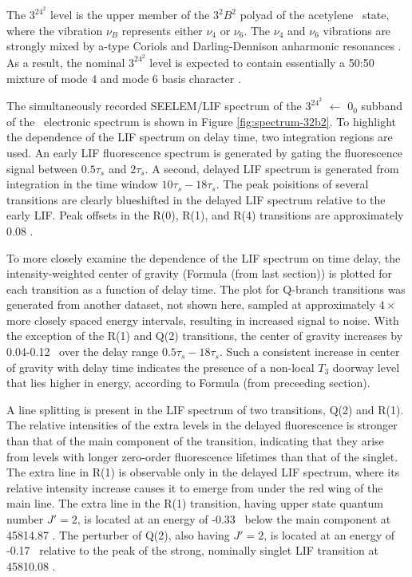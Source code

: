 \documentclass[12pt]{mitthesis}
\begin{document}
The $3^24^2$ level is the upper member of the $3^2B^2$ polyad of the
acetylene \astate\ state, where the vibration $\nu_B$ represents
either $\nu_4$ or $\nu_6$.  The $\nu_4$ and $\nu_6$ vibrations are
strongly mixed by a-type Coriols and Darling-Dennison anharmonic
resonances \cite{merer08}.  As a result, the nominal $3^24^2$ level is
expected to contain essentially a 50:50 mixture of mode 4 and mode 6
basis character \cite{merer08, virgo07}.

The simultaneously recorded SEELEM/LIF spectrum of the $3^24^2$ 
$\leftarrow$ $0_0$ subband of the \AtoX\ electronic spectrum is shown
in Figure \ref{fig:spectrum-32b2}. To highlight the dependence of the
LIF spectrum on delay time, two integration regions are used.  An
early LIF fluorescence spectrum is generated by gating the
fluorescence signal between $0.5\tau_s$ and $2\tau_s$.  A second,
delayed LIF spectrum is generated from integration in the time window
$10\tau_s-18\tau_s$.  The peak poisitions of several transitions are
clearly blueshifted in the delayed LIF spectrum relative to the early
LIF.  Peak offsets in the R(0), R(1), and R(4) transitions are
approximately 0.08 \rcm.

To more closely examine the dependence of the LIF spectrum on time
delay, the intensity-weighted center of gravity (Formula (from last
section)) is plotted for each transition as a function of delay time.
The plot for Q-branch transitions was generated from another dataset,
not shown here, sampled at approximately $4 \times$ more closely
spaced energy intervals, resulting in increased signal to noise.  With
the exception of the R(1) and Q(2) transitions, the center of gravity
increases by 0.04-0.12 \rcm\ over the delay range
$0.5\tau_s-18\tau_s$.  Such a consistent increase in center of gravity
with delay time indicates the presence of a non-local $T_3$ doorway
level that lies higher in energy, according to Formula (from
preceeding section).


A line splitting is present in the LIF spectrum of two transitions,
Q(2) and R(1).  The relative intensities of the extra levels in the
delayed fluorescence is stronger than that of the main component of
the transition, indicating that they arise from levels with longer
zero-order fluorescence lifetimes than that of the singlet.  The extra
line in R(1) is observable only in the delayed LIF spectrum, where its
relative intensity increase causes it to emerge from under the red
wing of the main line.  The extra line in the R(1) transition, having
upper state quantum number $J'=2$, is located at an energy of -0.33
\rcm\ below the main component at 45814.87 \rcm.  The perturber of
Q(2), also having $J'=2$, is located at an energy of -0.17 \rcm\
relative to the peak of the strong, nominally singlet LIF transition
at 45810.08 \rcm.
\end{document}
